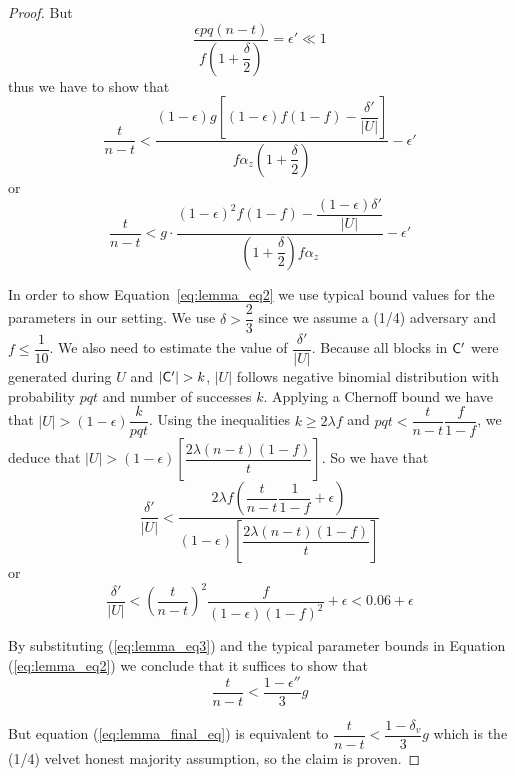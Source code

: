 \begin{proof}
But
\begin{equation*}
    \dfrac{\epsilon pq(n-t)}{f(1+\dfrac{\delta}{2})} = \epsilon' \ll 1
\end{equation*} thus we have to show that
\begin{equation*}
    \dfrac{t}{n-t} < \dfrac{  (1- \epsilon)g[ (1-\epsilon)f(1-f) - \dfrac{\delta'}{\lvert U \rvert} ] }  { f \alpha_z (1 + \dfrac{\delta}{2})} - \epsilon'
\end{equation*} or
\begin{equation}\label{eq:lemma_eq2}
    \dfrac{t}{n-t} < g \cdot \dfrac{(1-\epsilon)^2 f(1-f) - \dfrac{(1-\epsilon)\delta'}{\lvert U \rvert} }{(1+\dfrac{\delta}{2})f\alpha_z} - \epsilon'
\end{equation}

In order to show Equation~\ref{eq:lemma_eq2} we use typical bound values for the parameters in our setting. We use $\delta > \dfrac{2}{3}$ since we assume a (1/4) adversary and $f \leq \dfrac{1}{10}$. We also need to estimate the value of $\dfrac{\delta'}{\lvert U \rvert}$. Because all blocks in $\mathsf{C}'$ were generated during $U$ and $\lvert \mathsf{C}' \rvert > k $, $\lvert U \rvert$ follows negative binomial distribution with probability $pqt$ and number of successes $k$.
Applying a Chernoff bound we have that $\lvert U \rvert > (1-\epsilon) \dfrac{k}{pqt}$. Using the inequalities $k \geq 2\lambda f$ and $pqt < \dfrac{t}{n-t} \dfrac{f}{1-f}$, we deduce that $\lvert U \rvert > (1-\epsilon)[\dfrac{2\lambda (n-t)(1-f)}{t}]$. So we have that
\begin{equation*}
    \dfrac{\delta'}{\lvert U \rvert} < \dfrac{2\lambda f (\dfrac{t}{n-t} \dfrac{1}{1-f} + \epsilon)}{(1-\epsilon)[\dfrac{2\lambda (n-t)(1-f)}{t}]}
\end{equation*} or
\begin{equation}\label{eq:lemma_eq3}
    \dfrac{\delta'}{\lvert U \rvert} < \left( \dfrac{t}{n-t} \right)^2 \dfrac{f}{(1-\epsilon)(1-f)^2} + \epsilon < 0.06 + \epsilon
\end{equation}

By substituting (\ref{eq:lemma_eq3}) and the typical parameter bounds in Equation (\ref{eq:lemma_eq2}) we conclude that it suffices to show that
\begin{equation}\label{eq:lemma_final_eq}
    \dfrac{t}{n-t} < \dfrac{1-\epsilon''}{3}g
\end{equation}

But equation (\ref{eq:lemma_final_eq}) is equivalent to $\dfrac{t}{n-t} < \dfrac{1-\delta_v}{3}g$ which is the (1/4) velvet honest majority assumption, so the claim is proven.
\end{proof}

